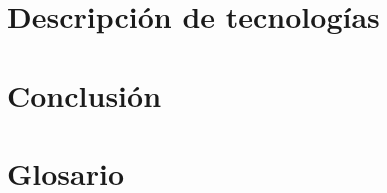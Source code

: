 \documentclass[a4paper,12pt,oneside]{book}
\begin{document}
\chapter{Descripción de tecnologías}

\backmatter

\chapter{Conclusión}


\chapter{Glosario}
\end{document}
